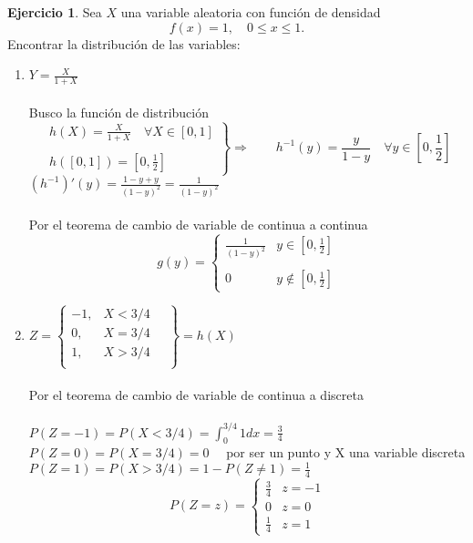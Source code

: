 \documentclass[a4paper, 12pt]{article}
\theoremstyle{definition}
\newtheorem{ej}{Ejercicio}
\begin{document}
\begin{ej}
	Sea $X$ una variable aleatoria con función de densidad
	\[f(x) = 1, \quad 0\leq x \leq 1.\]
	Encontrar la distribución de las variables:
	\begin{enumerate}[label=\textit{\alph*)}]
		\item $Y = \frac{X}{1+X}$ \\
		\\
		Busco la función de distribución
		\[\left. \begin{array}{c}
		h(X) = \frac{X}{1+X} \quad \forall X\in [0,1] \\
		\\
		h([0,1]) = \left[0, \frac{1}{2}\right] 
		\end{array} \right\} \Longrightarrow \qquad h^{-1}(y) =\frac{y}{1-y}\quad\forall y\in \left[0, \frac{1}{2}\right]\]
		\(\left(h^{-1}\right)'(y) =  \frac{1-y+y}{(1-y)^2} = \frac{1}{(1-y)^2}\) \\
		\\
		Por el teorema de cambio de variable de continua a continua
		\[g(y) = \left\{\begin{array}{cc}
		\frac{1}{(1-y)^2} & y \in \left[0, \frac{1}{2}\right] \\
		& \\
		0 & y \notin \left[0, \frac{1}{2}\right]
		\end{array}\right.\]
		
		\item $Z = \left\{\begin{array}{cc}
		-1, & X<3/4 \\
		0, & X=3/4 \\
		1, & X>3/4 \\
		\end{array} \quad\right\} = h(X)$ \\
		\\
		Por el teorema de cambio de variable de continua a discreta \\
		\\
		\(P(Z=-1) = P(X<3/4) = \int^{3/4}_0 1 dx = \frac{3}{4}\) \\
		\(P(Z=0) = P(X=3/4) = 0 \quad\) por ser un punto y X una variable discreta \\
		\(P(Z=1) = P(X>3/4) = 1-P(Z \neq 1) = \frac{1}{4}\)
		\[P(Z=z) = \left\{\begin{array}{cc}
		\frac{3}{4} & z = -1 \\
		0 & z = 0 \\
		\frac{1}{4} & z = 1
		\end{array}\right.\]
	\end{enumerate}
\end{ej}
\end{document}
